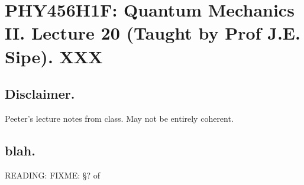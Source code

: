 
%

\chapter{PHY456H1F: Quantum Mechanics II.  Lecture 20 (Taught by Prof J.E. Sipe).  XXX}
\label{chap:qmTwoL20}
{}
\date{Nov 21, 2011}

\beginArtWithToc

\section{Disclaimer.}

Peeter's lecture notes from class.  May not be entirely coherent.

\section{blah.}

READING: FIXME: \S ? of \cite{desai2009quantum}

\EndArticle
